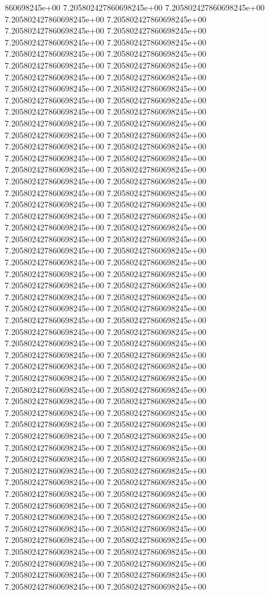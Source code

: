 860698245e+00	7.205802427860698245e+00	7.205802427860698245e+00	7.205802427860698245e+00	7.205802427860698245e+00	7.205802427860698245e+00	7.205802427860698245e+00	7.205802427860698245e+00	7.205802427860698245e+00	7.205802427860698245e+00	7.205802427860698245e+00	7.205802427860698245e+00	7.205802427860698245e+00	7.205802427860698245e+00	7.205802427860698245e+00	7.205802427860698245e+00	7.205802427860698245e+00	7.205802427860698245e+00	7.205802427860698245e+00	7.205802427860698245e+00	7.205802427860698245e+00	7.205802427860698245e+00	7.205802427860698245e+00	7.205802427860698245e+00	7.205802427860698245e+00	7.205802427860698245e+00	7.205802427860698245e+00	7.205802427860698245e+00	7.205802427860698245e+00	7.205802427860698245e+00	7.205802427860698245e+00	7.205802427860698245e+00	7.205802427860698245e+00	7.205802427860698245e+00	7.205802427860698245e+00	7.205802427860698245e+00	7.205802427860698245e+00	7.205802427860698245e+00	7.205802427860698245e+00	7.205802427860698245e+00	7.205802427860698245e+00	7.205802427860698245e+00	7.205802427860698245e+00	7.205802427860698245e+00	7.205802427860698245e+00	7.205802427860698245e+00	7.205802427860698245e+00	7.205802427860698245e+00	7.205802427860698245e+00	7.205802427860698245e+00	7.205802427860698245e+00	7.205802427860698245e+00	7.205802427860698245e+00	7.205802427860698245e+00	7.205802427860698245e+00	7.205802427860698245e+00	7.205802427860698245e+00	7.205802427860698245e+00	7.205802427860698245e+00	7.205802427860698245e+00	7.205802427860698245e+00	7.205802427860698245e+00	7.205802427860698245e+00	7.205802427860698245e+00	7.205802427860698245e+00	7.205802427860698245e+00	7.205802427860698245e+00	7.205802427860698245e+00	7.205802427860698245e+00	7.205802427860698245e+00	7.205802427860698245e+00	7.205802427860698245e+00	7.205802427860698245e+00	7.205802427860698245e+00	7.205802427860698245e+00	7.205802427860698245e+00	7.205802427860698245e+00	7.205802427860698245e+00	7.205802427860698245e+00	7.205802427860698245e+00	7.205802427860698245e+00	7.205802427860698245e+00	7.205802427860698245e+00	7.205802427860698245e+00	7.205802427860698245e+00	7.205802427860698245e+00	7.205802427860698245e+00	7.205802427860698245e+00	7.205802427860698245e+00	7.205802427860698245e+00	7.205802427860698245e+00	7.205802427860698245e+00	7.205802427860698245e+00	7.205802427860698245e+00	7.205802427860698245e+00	7.205802427860698245e+00	7.205802427860698245e+00	7.205802427860698245e+00	7.205802427860698245e+00	7.205802427860698245e+00	7.205802427860698245e+00	7.205802427860698245e+00	7.205802427860698245e+00
